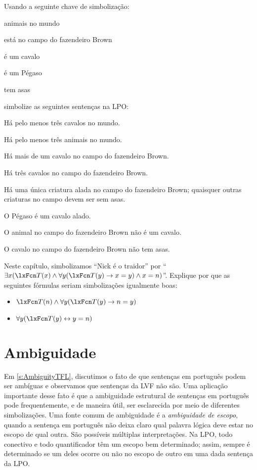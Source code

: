 \problempart
Usando a seguinte chave de simbolização:
\begin{ekey}
\item[\text{domínio}] animais no mundo
\item[\atom{B}{x}]  está no campo do fazendeiro Brown
\item[\atom{H}{x}]  é um cavalo
\item[\atom{P}{x}]  é um Pégaso
\item[\atom{W}{x}]  tem asas
\end{ekey}
simbolize as seguintes sentenças na LPO:
\begin{compactlist}
\item Há pelo menos três cavalos no mundo.
\item Há pelo menos três animais no mundo.
\item Há mais de um cavalo no campo do fazendeiro Brown.
\item Há três cavalos no campo do fazendeiro Brown.
\item Há uma única criatura alada no campo do fazendeiro Brown; quaisquer outras criaturas no campo devem ser sem asas.
\item O Pégaso é um cavalo alado.
\item O animal no campo do fazendeiro Brown não é um cavalo.
\item O cavalo no campo do fazendeiro Brown não tem asas.
\end{compactlist}

\problempart
Neste capítulo, simbolizamos \textquotedblleft Nick é o traidor\textquotedblright{} por \textquotedblleft $\exists x (\atom{T}{x} \eand \forall y(\atom{T}{y} \eif x = y) \eand x = n)$\textquotedblright{}. Explique por que as seguintes fórmulas seriam simbolizações igualmente boas:
	\begin{itemize}
		\item $\atom{T}{n} \eand \forall y(\atom{T}{y} \eif n = y)$
		\item $\forall y(\atom{T}{y} \eiff y = n)$
	\end{itemize}


\chapter{Ambiguidade}\label{s:ambiguityFOL}

Em \cref{s:AmbiguityTFL}, discutimos o fato de que sentenças em português podem ser ambíguas e observamos que sentenças da LVF não são. Uma aplicação importante desse fato é que a ambiguidade estrutural de sentenças em português pode frequentemente, e de maneira útil, ser esclarecida por meio de diferentes simbolizações. Uma fonte comum de ambiguidade é a \emph{ambiguidade de escopo}, quando a sentença em português não deixa claro qual palavra lógica deve estar no escopo de qual outra. São possíveis múltiplas interpretações. Na LPO, todo conectivo e todo quantificador têm um escopo bem determinado; assim, sempre é determinado se um deles ocorre ou não no escopo de outro em uma dada sentença da LPO.

